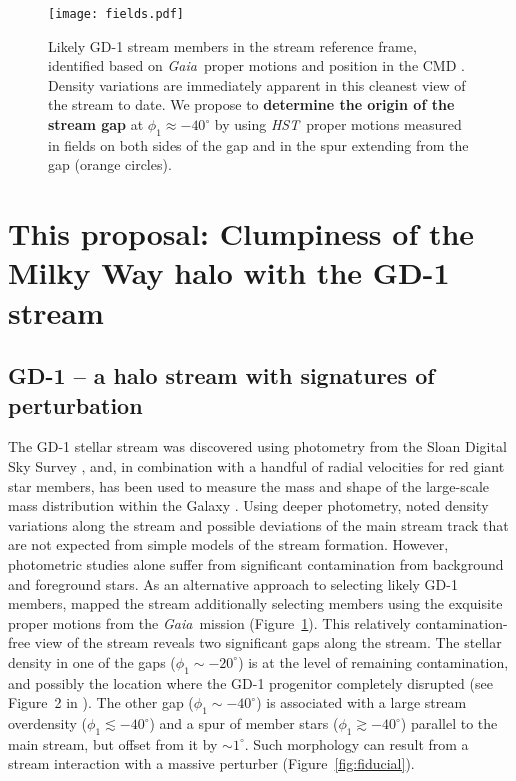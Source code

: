 \documentclass[12pt]{article}
\newcommand{\hst}{\textsl{HST}}
\newcommand{\gaia}{\textsl{Gaia}}
\begin{document}
\begin{figure}
\begin{center}
\texttt{[image: fields.pdf]}
\end{center}
\caption{
Likely GD-1 stream members in the stream reference frame, identified based on \gaia\ proper motions and position in the CMD \parencite{pwb2018}.
Density variations are immediately apparent in this cleanest view of the stream to date.
We propose to {\bf determine the origin of the stream gap} at $\phi_1\approx-40^\circ$ by using \hst\ proper motions measured in fields on both sides of the gap and in the spur extending from the gap (orange circles).
}
\label{fig:fields}
\end{figure}

\section*{This proposal: Clumpiness of the Milky Way halo with the GD-1 stream}

\subsection*{GD-1 -- a halo stream with signatures of perturbation}
The GD-1 stellar stream was discovered using photometry from the Sloan Digital Sky Survey \parencite{grillmair2006},
and, in combination with a handful of radial velocities for red giant star members, has been used to measure the mass and shape of the large-scale mass distribution within the Galaxy \parencite{koposov2010, bovy2016}.
Using deeper photometry, \textcite{deboer2018} noted density variations along the stream and possible deviations of the main stream track that are not expected from simple models of the stream formation.
However, photometric studies alone suffer from significant contamination from background and foreground stars.
As an alternative approach to selecting likely GD-1 members, \textcite{pwb2018} mapped the stream additionally selecting members using the exquisite proper motions from the \gaia\ mission (Figure~\ref{fig:fields}).
This relatively contamination-free view of the stream reveals two significant gaps along the stream.
The stellar density in one of the gaps ($\phi_1\sim-20^\circ$) is at the level of remaining contamination, and possibly the location where the GD-1 progenitor completely disrupted (see Figure~2 in \cite{pwb2018}).
The other gap ($\phi_1\sim-40^\circ$) is associated with a large stream overdensity ($\phi_1\lesssim-40^\circ$) and a spur of member stars ($\phi_1\gtrsim-40^\circ$) parallel to the main stream, but offset from it by $\sim1^\circ$.
Such morphology can result from a stream interaction with a massive perturber (Figure~\ref{fig:fiducial}).
\end{document}
